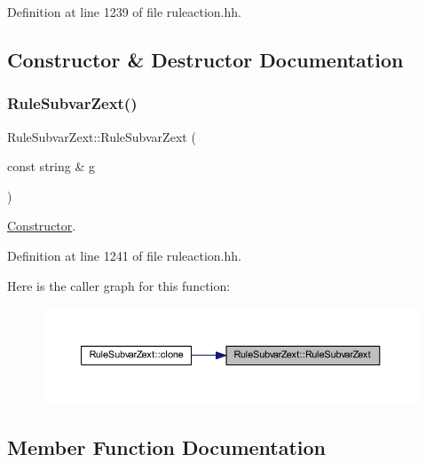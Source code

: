 Definition at line 1239 of file ruleaction.\+hh.



\subsection{Constructor \& Destructor Documentation}
\mbox{\label{class_rule_subvar_zext_a6e535e64ef65b3d0e1bc42a95513c727}} 
\subsubsection{\texorpdfstring{RuleSubvarZext()}{RuleSubvarZext()}}
{\footnotesize\ttfamily Rule\+Subvar\+Zext\+::\+Rule\+Subvar\+Zext (\begin{DoxyParamCaption}\item[{const string \&}]{g }\end{DoxyParamCaption})\hspace{0.3cm}{\ttfamily [inline]}}



\mbox{\hyperlink{class_constructor}{Constructor}}. 



Definition at line 1241 of file ruleaction.\+hh.

Here is the caller graph for this function\+:
\nopagebreak
\begin{figure}[H]
\begin{center}
\leavevmode
\includegraphics[width=350pt]{class_rule_subvar_zext_a6e535e64ef65b3d0e1bc42a95513c727_icgraph}
\end{center}
\end{figure}


\subsection{Member Function Documentation}
\mbox{\label{class_rule_subvar_zext_a9336da44138d6e55d5702de806649402}} 
